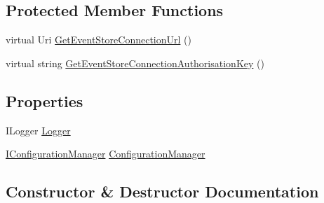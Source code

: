 \subsection*{Protected Member Functions}
\begin{DoxyCompactItemize}
\item 
virtual Uri \hyperlink{classCqrs_1_1Azure_1_1DocumentDb_1_1Events_1_1AzureDocumentDbEventStoreConnectionStringFactory_a53d282392000624128304c6477a2a466_a53d282392000624128304c6477a2a466}{Get\+Event\+Store\+Connection\+Url} ()
\item 
virtual string \hyperlink{classCqrs_1_1Azure_1_1DocumentDb_1_1Events_1_1AzureDocumentDbEventStoreConnectionStringFactory_aa16b2178e1ca8893c120097f6dd47022_aa16b2178e1ca8893c120097f6dd47022}{Get\+Event\+Store\+Connection\+Authorisation\+Key} ()
\end{DoxyCompactItemize}
\subsection*{Properties}
\begin{DoxyCompactItemize}
\item 
I\+Logger \hyperlink{classCqrs_1_1Azure_1_1DocumentDb_1_1Events_1_1AzureDocumentDbEventStoreConnectionStringFactory_a5512879778ae56a8ee26baf52be1cdd3_a5512879778ae56a8ee26baf52be1cdd3}{Logger}
\item 
\hyperlink{interfaceCqrs_1_1Configuration_1_1IConfigurationManager}{I\+Configuration\+Manager} \hyperlink{classCqrs_1_1Azure_1_1DocumentDb_1_1Events_1_1AzureDocumentDbEventStoreConnectionStringFactory_a17abd52e82be8c2dea8f5ef5edb53b85_a17abd52e82be8c2dea8f5ef5edb53b85}{Configuration\+Manager}
\end{DoxyCompactItemize}


\subsection{Constructor \& Destructor Documentation}
\mbox{\label{classCqrs_1_1Azure_1_1DocumentDb_1_1Events_1_1AzureDocumentDbEventStoreConnectionStringFactory_a7503e00bedc6af5686ded0b6b7719a30_a7503e00bedc6af5686ded0b6b7719a30}} 
